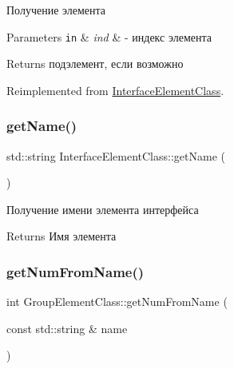 Получение элемента 


\begin{DoxyParams}[1]{Parameters}
\mbox{\tt in}  & {\em ind} & -\/ индекс элемента \\
\hline
\end{DoxyParams}
\begin{DoxyReturn}{Returns}
подэлемент, если возможно 
\end{DoxyReturn}


Reimplemented from \hyperlink{class_interface_element_class_aee5a321eaf772ef561bab59b51fb36b9}{Interface\+Element\+Class}.

\mbox{\label{class_interface_element_class_a7815b1d9629ff4dc8a83c170dbb171fc}} 
\subsubsection{\texorpdfstring{get\+Name()}{getName()}}
{\footnotesize\ttfamily std\+::string Interface\+Element\+Class\+::get\+Name (\begin{DoxyParamCaption}{ }\end{DoxyParamCaption})\hspace{0.3cm}{\ttfamily [inherited]}}



Получение имени элемента интерфейса 

\begin{DoxyReturn}{Returns}
Имя элемента 
\end{DoxyReturn}
\mbox{\label{class_group_element_class_a6a44164ddddfb4ca3510f46fc393c3fa}} 
\subsubsection{\texorpdfstring{get\+Num\+From\+Name()}{getNumFromName()}}
{\footnotesize\ttfamily int Group\+Element\+Class\+::get\+Num\+From\+Name (\begin{DoxyParamCaption}\item[{const std\+::string \&}]{name }\end{DoxyParamCaption})\hspace{0.3cm}{\ttfamily [private]}}



